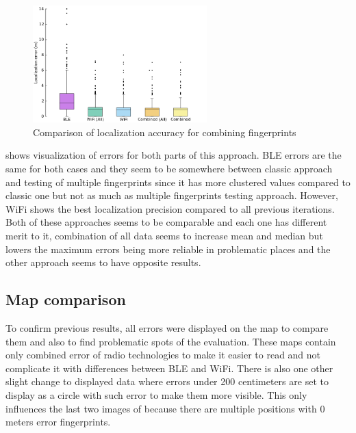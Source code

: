 \begin{figure}[h!]
	\begin{centering}
		\includegraphics[width=0.6\textwidth]{img/wknn_errors_combined}
		\par\end{centering}
	\caption{Comparison of localization accuracy for combining fingerprints}
	\label{fig08c06}
\end{figure}

 shows visualization of errors for both parts of this approach. BLE errors are the same for both cases and they seem to be somewhere between classic approach and testing of multiple fingerprints since it has more clustered values compared to classic one but not as much as multiple fingerprints testing approach. However, WiFi shows the best localization precision compared to all previous iterations. Both of these approaches seems to be comparable and each one has different merit to it, combination of all data seems to increase mean and median but lowers the maximum errors being more reliable in problematic places and the other approach seems to have opposite results.

\subsection{Map comparison}\label{sec:MapComparison}
To confirm previous results, all errors were displayed on the map to compare them and also to find problematic spots of the evaluation. These maps contain only combined error of radio technologies to make it easier to read and not complicate it with differences between BLE and WiFi. There is also one other slight change to displayed data where errors under 200 centimeters are set to display as a circle with such error to make them more visible. This only influences the last two images of  because there are multiple positions with 0 meters error fingerprints.

